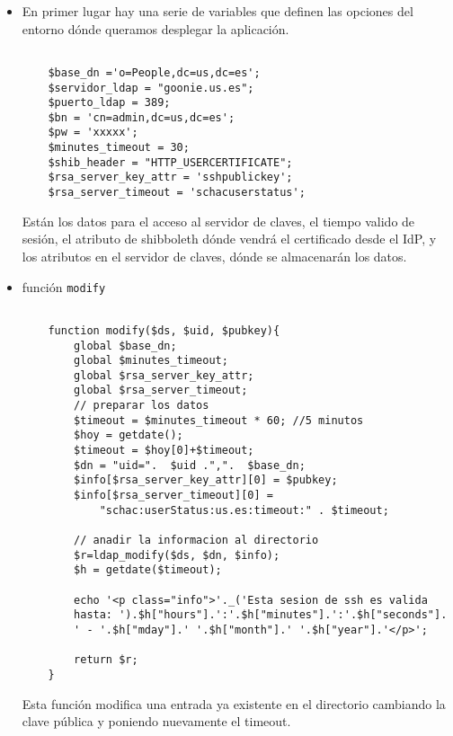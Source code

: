     \begin{itemize}

    \item En primer lugar hay una serie de variables que definen las opciones del
    entorno dónde queramos desplegar la aplicación.

    \begin{lstlisting}

    $base_dn ='o=People,dc=us,dc=es';
    $servidor_ldap = "goonie.us.es";
    $puerto_ldap = 389;
    $bn = 'cn=admin,dc=us,dc=es';
    $pw = 'xxxxx';
    $minutes_timeout = 30;
    $shib_header = "HTTP_USERCERTIFICATE";
    $rsa_server_key_attr = 'sshpublickey';
    $rsa_server_timeout = 'schacuserstatus';

    \end{lstlisting}

    Están los datos para el acceso al servidor de claves, el tiempo valido
    de sesión, el atributo de shibboleth dónde vendrá el certificado desde
    el IdP, y los atributos en el servidor de claves, dónde se almacenarán
    los datos.


    \item función \texttt{modify}
    
    \begin{lstlisting}

    function modify($ds, $uid, $pubkey){
        global $base_dn;
        global $minutes_timeout;
        global $rsa_server_key_attr;
        global $rsa_server_timeout;
        // preparar los datos
        $timeout = $minutes_timeout * 60; //5 minutos
        $hoy = getdate();
        $timeout = $hoy[0]+$timeout;
        $dn = "uid=".  $uid .",".  $base_dn;
        $info[$rsa_server_key_attr][0] = $pubkey;
        $info[$rsa_server_timeout][0] = 
            "schac:userStatus:us.es:timeout:" . $timeout;

        // anadir la informacion al directorio
        $r=ldap_modify($ds, $dn, $info);
        $h = getdate($timeout);
        
        echo '<p class="info">'._('Esta sesion de ssh es valida 
        hasta: ').$h["hours"].':'.$h["minutes"].':'.$h["seconds"].
        ' - '.$h["mday"].' '.$h["month"].' '.$h["year"].'</p>';

        return $r;
    }

    \end{lstlisting}

    Esta función modifica una entrada ya existente en el directorio
    cambiando la clave pública y poniendo nuevamente el timeout.


\end{itemize}
